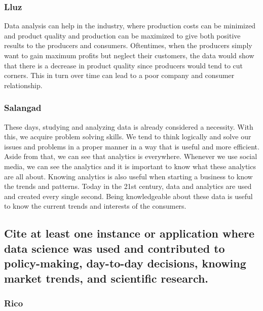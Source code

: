 \documentclass[
]{article}
\begin{document}
\hypertarget{lluz}{%
\subsubsection{Lluz}\label{lluz}}

Data analysis can help in the industry, where production costs can be
minimized and product quality and production can be maximized to give
both positive results to the producers and consumers. Oftentimes, when
the producers simply want to gain maximum profits but neglect their
customers, the data would show that there is a decrease in product
quality since producers would tend to cut corners. This in turn over
time can lead to a poor company and consumer relationship.

\hypertarget{salangad}{%
\subsubsection{Salangad}\label{salangad}}

These days, studying and analyzing data is already considered a
necessity. With this, we acquire problem solving skills. We tend to
think logically and solve our issues and problems in a proper manner in
a way that is useful and more efficient. Aside from that, we can see
that analytics is everywhere. Whenever we use social media, we can see
the analytics and it is important to know what these analytics are all
about. Knowing analytics is also useful when starting a business to know
the trends and patterns. Today in the 21st century, data and analytics
are used and created every single second. Being knowledgeable about
these data is useful to know the current trends and interests of the
consumers.

\hypertarget{cite-at-least-one-instance-or-application-where-data-science-was-used-and-contributed-to-policy-making-day-to-day-decisions-knowing-market-trends-and-scientific-research.}{%
\subsection{Cite at least one instance or application where data science
was used and contributed to policy-making, day-to-day decisions, knowing
market trends, and scientific
research.}\label{cite-at-least-one-instance-or-application-where-data-science-was-used-and-contributed-to-policy-making-day-to-day-decisions-knowing-market-trends-and-scientific-research.}}

\hypertarget{rico-1}{%
\subsubsection{Rico}\label{rico-1}}
\end{document}

